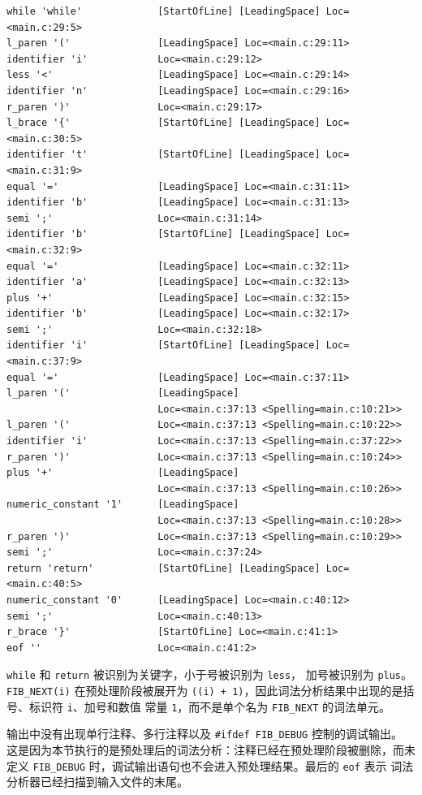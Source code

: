 \documentclass[UTF8,a4paper,10pt]{ctexart}
\begin{document}
\begin{enumerate}[label=\roman*.]
\begin{lstlisting}[style=asm]
while 'while'             [StartOfLine] [LeadingSpace] Loc=<main.c:29:5>
l_paren '('               [LeadingSpace] Loc=<main.c:29:11>
identifier 'i'            Loc=<main.c:29:12>
less '<'                  [LeadingSpace] Loc=<main.c:29:14>
identifier 'n'            [LeadingSpace] Loc=<main.c:29:16>
r_paren ')'               Loc=<main.c:29:17>
l_brace '{'               [StartOfLine] [LeadingSpace] Loc=<main.c:30:5>
identifier 't'            [StartOfLine] [LeadingSpace] Loc=<main.c:31:9>
equal '='                 [LeadingSpace] Loc=<main.c:31:11>
identifier 'b'            [LeadingSpace] Loc=<main.c:31:13>
semi ';'                  Loc=<main.c:31:14>
identifier 'b'            [StartOfLine] [LeadingSpace] Loc=<main.c:32:9>
equal '='                 [LeadingSpace] Loc=<main.c:32:11>
identifier 'a'            [LeadingSpace] Loc=<main.c:32:13>
plus '+'                  [LeadingSpace] Loc=<main.c:32:15>
identifier 'b'            [LeadingSpace] Loc=<main.c:32:17>
semi ';'                  Loc=<main.c:32:18>
identifier 'i'            [StartOfLine] [LeadingSpace] Loc=<main.c:37:9>
equal '='                 [LeadingSpace] Loc=<main.c:37:11>
l_paren '('               [LeadingSpace]
                          Loc=<main.c:37:13 <Spelling=main.c:10:21>>
l_paren '('               Loc=<main.c:37:13 <Spelling=main.c:10:22>>
identifier 'i'            Loc=<main.c:37:13 <Spelling=main.c:37:22>>
r_paren ')'               Loc=<main.c:37:13 <Spelling=main.c:10:24>>
plus '+'                  [LeadingSpace]
                          Loc=<main.c:37:13 <Spelling=main.c:10:26>>
numeric_constant '1'      [LeadingSpace]
                          Loc=<main.c:37:13 <Spelling=main.c:10:28>>
r_paren ')'               Loc=<main.c:37:13 <Spelling=main.c:10:29>>
semi ';'                  Loc=<main.c:37:24>
return 'return'           [StartOfLine] [LeadingSpace] Loc=<main.c:40:5>
numeric_constant '0'      [LeadingSpace] Loc=<main.c:40:12>
semi ';'                  Loc=<main.c:40:13>
r_brace '}'               [StartOfLine] Loc=<main.c:41:1>
eof ''                    Loc=<main.c:41:2>
\end{lstlisting}

\verb|while| 和 \verb|return| 被识别为关键字，小于号被识别为 \verb|less|，
加号被识别为 \verb|plus|。\verb|FIB_NEXT(i)| 在预处理阶段被展开为
\verb|((i) + 1)|，因此词法分析结果中出现的是括号、标识符 \verb|i|、加号和数值
常量 \verb|1|，而不是单个名为 \verb|FIB_NEXT| 的词法单元。

输出中没有出现单行注释、多行注释以及 \verb|#ifdef FIB_DEBUG| 控制的调试输出。
这是因为本节执行的是预处理后的词法分析：注释已经在预处理阶段被删除，而未定义
\verb|FIB_DEBUG| 时，调试输出语句也不会进入预处理结果。最后的 \verb|eof| 表示
词法分析器已经扫描到输入文件的末尾。
\end{enumerate}
\end{document}
